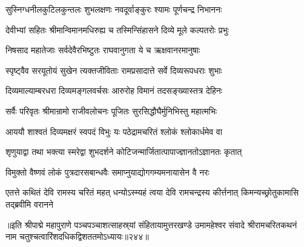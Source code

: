 \twolineshloka
{सुस्निग्धनीलकुटिलकुन्तलः शुभलक्षणः}
{नवदूर्वाङ्कुरः श्यामः पूर्णचन्द्र निभाननः}%

\twolineshloka
{देवीभ्यां सहितः श्रीमान्विमानमधिरुह्य च}
{तस्मिन्सिंहासने दिव्ये मूले कल्पतरोः प्रभुः}%

\twolineshloka
{निषसाद महातेजाः सर्वदेवैरभिष्टुतः}
{राघवानुगता ये च ऋक्षवानरमानुषाः}%

\twolineshloka
{स्पृष्ट्वैव सरयूतोयं सुखेन त्यक्तजीविताः}
{रामप्रसादात्ते सर्वे दिव्यरूपधराः शुभाः}%

\twolineshloka
{दिव्यमाल्याम्बरधरा दिव्यमङ्गलवर्चसः}
{आरुरोह विमानं तदसङ्ख्यास्तत्र देहिनः}%

\twolineshloka
{सर्वैः परिवृतः श्रीमान्रामो राजीवलोचनः}
{पूजितः सुरसिद्धौघैर्मुनिभिस्तु महात्मभिः}%

\twolineshloka
{आययौ शाश्वतं दिव्यमक्षरं स्वपदं विभुः}
{यः पठेद्रामचरितं श्लोकं श्लोकार्धमेव वा}%

\twolineshloka
{शृणुयाद्वा तथा भक्त्या स्मरेद्वा शुभदर्शने}
{कोटिजन्मार्जितात्पापाज्ज्ञानतोऽज्ञानतः कृतात्}%

\twolineshloka
{विमुक्तो वैष्णवं लोकं पुत्रदारसबान्धवैः}
{समाप्नुयाद्योगगम्यमनायासेन वै नरः}%


\onelineshloka
{एतत्ते कथितं देवि रामस्य चरितं महत्}
{धन्योऽस्म्यहं त्वया देवि रामचन्द्रस्य कीर्त्तनात्}
{किमन्यच्छ्रोतुकामासि तद्ब्रवीमि वरानने}%

{॥इति श्रीपाद्मे महापुराणे पञ्चपञ्चाशत्साहस्र्यां संहितायामुत्तरखण्डे उमामहेश्वर संवादे श्रीरामचरितकथनं नाम चतुश्चत्वारिंशदधिकद्विशततमोऽध्यायः॥२४४॥}


